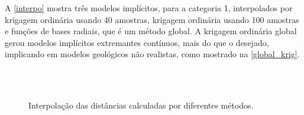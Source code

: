 A \autoref{interpo} mostra três modelos implícitos, para a categoria 1, interpolados por krigagem ordinária usando 40 amostras, krigagem ordinária usando 100 amostras e funções de bases radiais, que é um método global. A krigagem ordinária global gerou modelos implícitos extremantes contínuos, mais do que o desejado, implicando em modelos geológicos não realistas, como mostrado na \autoref{global_krig}. 

\begin{figure}[H] 
    \caption{Interpolação das distâncias calculadas por diferentes métodos.} \label{interpo}
     \centering
     \\
     \\
\end{figure}

